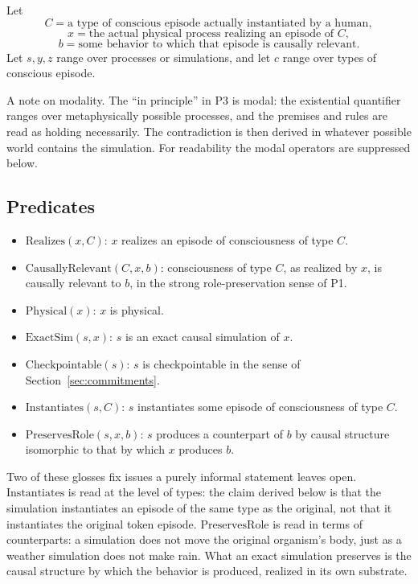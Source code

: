 \documentclass[11pt]{article}
\begin{document}
Let
\[
  C = \text{a type of conscious episode actually instantiated by a human},
\]
\[
  x = \text{the actual physical process realizing an episode of } C,
\]
\[
  b = \text{some behavior to which that episode is causally relevant}.
\]
Let \(s,y,z\) range over processes or simulations, and let \(c\) range over
types of conscious episode.

A note on modality. The ``in principle'' in P3 is modal: the existential
quantifier ranges over metaphysically possible processes, and the premises and
rules are read as holding necessarily. The contradiction is then derived in
whatever possible world contains the simulation. For readability the modal
operators are suppressed below.

\subsection*{Predicates}

\begin{itemize}
  \item \(\mathrm{Realizes}(x,C)\): \(x\) realizes an episode of consciousness
        of type \(C\).
  \item \(\mathrm{CausallyRelevant}(C,x,b)\): consciousness of type \(C\), as
        realized by \(x\), is causally relevant to \(b\), in the strong
        role-preservation sense of P1.
  \item \(\mathrm{Physical}(x)\): \(x\) is physical.
  \item \(\mathrm{ExactSim}(s,x)\): \(s\) is an exact causal simulation of
        \(x\).
  \item \(\mathrm{Checkpointable}(s)\): \(s\) is checkpointable in the sense of
        Section~\ref{sec:commitments}.
  \item \(\mathrm{Instantiates}(s,C)\): \(s\) instantiates some episode of
        consciousness of type \(C\).
  \item \(\mathrm{PreservesRole}(s,x,b)\): \(s\) produces a counterpart of
        \(b\) by causal structure isomorphic to that by which \(x\) produces
        \(b\).
\end{itemize}

\noindent
Two of these glosses fix issues a purely informal statement leaves open.
\(\mathrm{Instantiates}\) is read at the level of types: the claim derived
below is that the simulation instantiates an episode of the same type as the
original, not that it instantiates the original token episode.
\(\mathrm{PreservesRole}\) is read in terms of counterparts: a simulation does
not move the original organism's body, just as a weather simulation does not
make rain. What an exact simulation preserves is the causal structure by which
the behavior is produced, realized in its own substrate.
\end{document}
